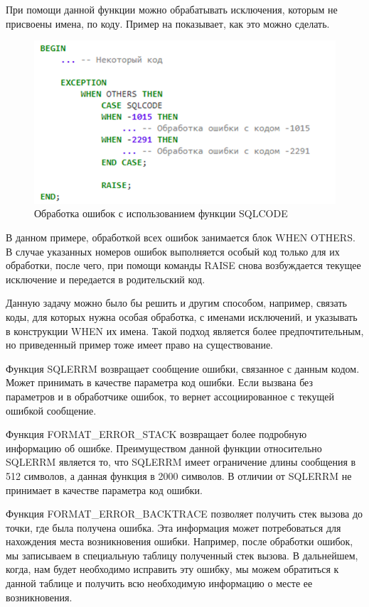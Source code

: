 При помощи данной функции можно обрабатывать исключения, которым не присвоены имена, по коду. Пример на  показывает, как это можно сделать. 

\begin{figure}[ht!] 
	\center
	\includegraphics [scale=1] {my_folder/img/C1_handling_by_sqlcode}
	\caption{Обработка ошибок с использованием функции SQLCODE} 
	\label{fig:C1_handling_by_sqlcode}  
\end{figure}
\FloatBarrier

В данном примере, обработкой всех ошибок занимается блок WHEN OTHERS. В случае указанных номеров ошибок выполняется особый код только для их обработки, после чего, при помощи команды RAISE снова возбуждается текущее исключение и передается в родительский код. 

Данную задачу можно было бы решить и другим способом, например, связать коды, для которых нужна особая обработка, с именами исключений, и указывать в конструкции WHEN их имена. Такой подход является более предпочтительным, но приведенный пример тоже имеет право на существование.

Функция SQLERRM возвращает сообщение ошибки, связанное с данным кодом. Может принимать в качестве параметра код ошибки. Если вызвана без параметров и в обработчике ошибок, то вернет ассоциированное с текущей ошибкой сообщение. 

Функция FORMAT\_ERROR\_STACK возвращает более подробную информацию об ошибке. Преимуществом данной функции относительно SQLERRM является то, что SQLERRM имеет ограничение длины сообщения в 512 символов, а данная функция в 2000 символов. В отличии от SQLERRM не принимает в качестве параметра код ошибки.

Функция FORMAT\_ERROR\_BACKTRACE позволяет получить стек вызова до точки, где была получена ошибка. Эта информация может потребоваться для нахождения места возникновения ошибки. Например, после обработки ошибок, мы записываем в специальную таблицу полученный стек вызова. В дальнейшем, когда, нам будет необходимо исправить эту ошибку, мы можем обратиться к данной таблице и получить всю необходимую информацию о месте ее возникновения. 


